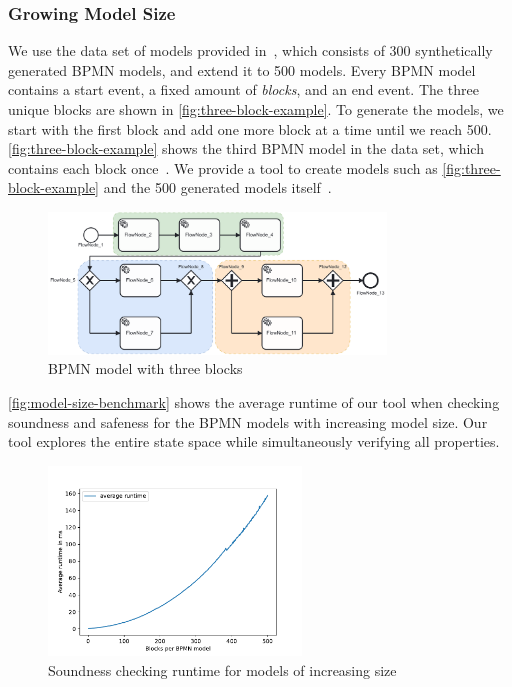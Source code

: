 \documentclass[runningheads]{llncs}
\begin{document}
\subsubsection{Growing Model Size}
We use the data set of models provided in~\cite{krauterHigherorderTransformationApproach2023}, which consists of 300 synthetically generated BPMN models, and extend it to 500 models.
Every BPMN model contains a start event, a fixed amount of \textit{blocks}, and an end event.
The three unique blocks are shown in \autoref{fig:three-block-example}.
To generate the models, we start with the first block and add one more block at a time until we reach 500.
\autoref{fig:three-block-example} shows the third BPMN model in the data set, which contains each block once~\cite{krauterHigherorderTransformationApproach2023}.
We provide a tool to create models such as \autoref{fig:three-block-example} and the 500 generated models itself~\cite{noauthorgivenBPM2024Artifacts2024}.

\begin{figure}[ht]
	\centering
	\includegraphics[width=0.8\textwidth]{images/three-blocks}
	\caption{BPMN model with three blocks~\cite{krauterHigherorderTransformationApproach2023}}
	\label{fig:three-block-example}
\end{figure}

\autoref{fig:model-size-benchmark} shows the average runtime of our tool when checking soundness and safeness for the BPMN models with increasing model size.
Our tool explores the entire state space while simultaneously verifying all properties.

\begin{figure}[ht]
	\centering
	\includegraphics[width=0.6\textwidth]{images/model-size-benchmark}
	\caption{Soundness checking runtime for models of increasing size}
	\label{fig:model-size-benchmark}
\end{figure}
\end{document}
